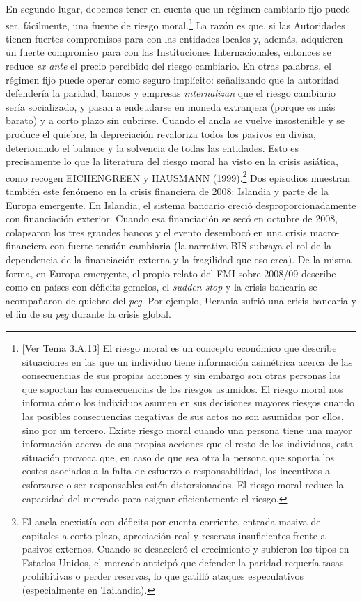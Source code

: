 \documentclass[10pt,a4paper]{article}
\newcommand{\authorfont}[1]{{\fontfamily{EBGaramond-TLF}\selectfont #1}}
\begin{document}
En segundo lugar, debemos tener en cuenta que un régimen cambiario fijo puede ser, fácilmente, una fuente de riesgo moral.\footnote{%
  [\authorfont{Ver Tema 3.A.13}] El riesgo moral es un concepto económico que describe situaciones en las que un individuo tiene información asimétrica acerca de las consecuencias de sus propias acciones y sin embargo son otras personas las que soportan las consecuencias de los riesgos asumidos. El riesgo moral nos informa cómo los individuos asumen en sus decisiones mayores riesgos cuando las posibles consecuencias negativas de sus actos no son asumidas por ellos, sino por un tercero. Existe riesgo moral cuando una persona tiene una mayor información acerca de sus propias acciones que el resto de los individuos, esta situación provoca que, en caso de que sea otra la persona que soporta los costes asociados a la falta de esfuerzo o responsabilidad, los incentivos a esforzarse o ser responsables estén distorsionados. El riesgo moral reduce la capacidad del mercado para asignar eficientemente el riesgo.
} La razón es que, si las Autoridades tienen fuertes compromisos para con las entidades locales y, además, adquieren un fuerte compromiso para con las Instituciones Internacionales, entonces se reduce \textit{ex ante} el precio percibido del riesgo cambiario. En otras palabras, el régimen fijo puede operar como seguro implícito: señalizando que la autoridad defendería la paridad, bancos y empresas \textit{internalizan} que el riesgo cambiario sería socializado, y pasan a endeudarse en moneda extranjera (porque es más barato) y a corto plazo sin cubrirse. Cuando el ancla se vuelve insostenible y se produce el quiebre, la depreciación revaloriza todos los pasivos en divisa, deteriorando el balance y la solvencia de todas las entidades. Esto es precisamente lo que la literatura del riesgo moral ha visto en la crisis asiática, como recogen EICHENGREEN y HAUSMANN (1999).\footnote{%
    El ancla coexistía con déficits por cuenta corriente, entrada masiva de capitales a corto plazo, apreciación real y reservas insuficientes frente a pasivos externos. Cuando se desaceleró el crecimiento y subieron los tipos en Estados Unidos, el mercado anticipó que defender la paridad requería tasas prohibitivas o perder reservas, lo que gatilló ataques especulativos (especialmente en Tailandia).
} Dos episodios muestran también este fenómeno en la crisis financiera de 2008: Islandia y parte de la Europa emergente. En Islandia, el sistema bancario creció desproporcionadamente con financiación exterior. Cuando esa financiación se secó en octubre de 2008, colapsaron los tres grandes bancos y el evento desembocó en una crisis macro-financiera con fuerte tensión cambiaria (la narrativa BIS subraya el rol de la dependencia de la financiación externa y la fragilidad que eso crea). De la misma forma, en Europa emergente, el propio relato del FMI sobre 2008/09 describe como en países con déficits gemelos, el \textit{sudden stop} y la crisis bancaria se acompañaron de quiebre del \textit{peg}. Por ejemplo, Ucrania sufrió una crisis bancaria y el fin de su \textit{peg} durante la crisis global. 
\end{document}
